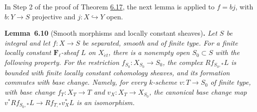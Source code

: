 \documentclass[11pt]{article}
\newenvironment{bpstatement}[2]{\par\addvspace{0.6\baselineskip}\noindent\textbf{#1}#2\textbf{.}\enspace\ignorespaces}
  {\par\addvspace{0.4\baselineskip}}
\newenvironment{bpstatementit}[2]{\begin{bpstatement}{#1}{#2}\itshape\ignorespaces}{\end{bpstatement}}
\providecommand{\Fell}{}\renewcommand{\Fell}{\mathbf F_\ell}
\begin{document}
\label{bp544}%
In Step 2 of the proof of Theorem \hyperref[bp563]{6.17}, the next lemma is applied to \(f=bj\), with \(b:Y\to S\) projective and \(j:X\hookrightarrow Y\) open.

\label{bp545}%
\begin{bpstatementit}{Lemma~6.10}{ (Smooth morphisms and locally constant sheaves)}
Let \(S\) be integral and let \(f:X\to S\) be separated, smooth and of finite type. For a finite locally constant \(\Fell\)-sheaf \(L\) on \(X_{\acute{e}t}\), there is a nonempty open \(S_0\subset S\) with the following property. For the restriction \(f_{S_0}:X_{S_0}\to S_0\), the complex \(Rf_{S_0,*}L\) is bounded with finite locally constant cohomology sheaves, and its formation commutes with base change. Namely, for every \(k\)-scheme \(v:T\to S_0\) of finite type, with base change \(f_T:X_T\to T\) and \(v_X:X_T\to X_{S_0}\), the canonical base change map \(v^*Rf_{S_0,*}L\to Rf_{T,*}v_X^*L\) is an isomorphism.
\end{bpstatementit}
\end{document}
